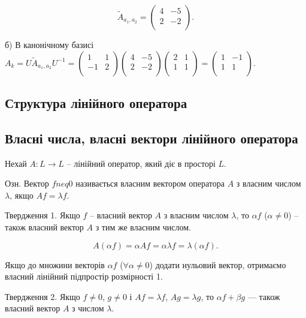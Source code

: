 $$\tilde{A}_{a_1, a_2} = \begin{pmatrix}
	4 & -5 \\
	2 & -2 \\
\end{pmatrix}.$$

б) В канонічному базисі $A_k = U \tilde{A}_{a_1, a_2} U^{-1} = \begin{pmatrix}
	1 & 1 \\
	-1 & 2 \\
\end{pmatrix} \begin{pmatrix}
	4 & -5 \\
	2 & -2 \\
\end{pmatrix} \begin{pmatrix}
	2 & 1 \\
	1 & 1 \\
\end{pmatrix} = \begin{pmatrix}
	1 & -1 \\
	1 & 1 \\
\end{pmatrix}.$

\subsection{Структура лінійного оператора}

\subsection*{Власні числа, власні вектори лінійного оператора}

Нехай $A: L \rightarrow L$ -- лінійний оператор, який діє в просторі $L$.

Озн. Вектор $f neq 0$ називається власним вектором оператора $A$ з
власним числом $\lambda$, якщо $A f = \lambda f$.

Твердження 1. Якщо $f$ -- власний вектор $A$ з власним числом $\lambda$, то $\alpha f$
($\alpha \neq 0$) -- також власний вектор $A$ з тим же власним числом.

$$A(\alpha f) = \alpha A f = \alpha \lambda f = \lambda(\alpha f).$$

Якщо до множини векторів $\alpha f$ ($\forall \alpha \neq 0$) додати нульовий вектор,
отримаємо власний лінійний підпростір розмірності 1.

Твердження 2. Якщо $f \neq 0$, $g \neq 0$ і $A f = \lambda f$, $A g = \lambda g$, то $\alpha f + \beta g$ ---
також власний вектор $A$ з числом $\lambda$.

